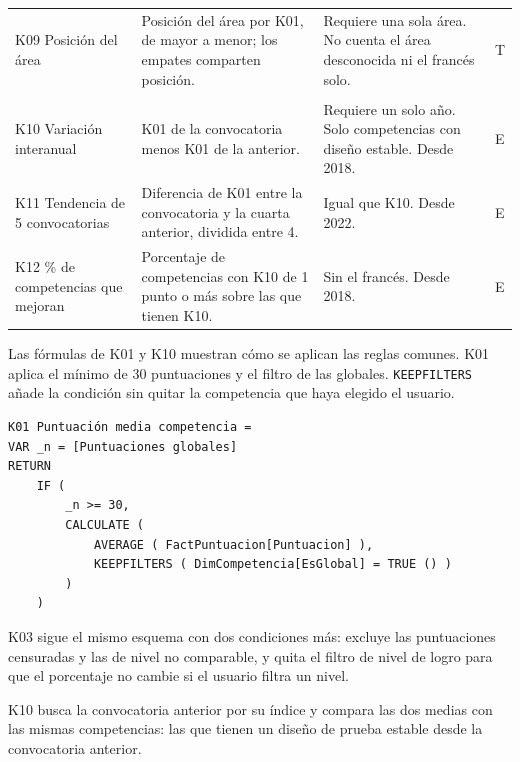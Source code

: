 \documentclass[12pt, a4paper, oneside]{report}
\begin{document}
{\begin{longtable}{@{} >{\raggedright\arraybackslash}p{2.6cm} p{5.9cm} p{4.3cm} >{\raggedright\arraybackslash}p{1.1cm} @{}}
K09 Posición del área & Posición del área por K01, de mayor a menor; los empates comparten posición. & Requiere una sola área. No cuenta el área desconocida ni el francés solo. & T \\ \addlinespace
\multicolumn{4}{@{}l}{\textit{Eficiencia y progreso}} \\
K10 Variación interanual & K01 de la convocatoria menos K01 de la anterior. & Requiere un solo año. Solo competencias con diseño estable. Desde 2018. & E \\ \addlinespace
K11 Tendencia de 5 convocatorias & Diferencia de K01 entre la convocatoria y la cuarta anterior, dividida entre 4. & Igual que K10. Desde 2022. & E \\ \addlinespace
K12 \% de competencias que mejoran & Porcentaje de competencias con K10 de 1 punto o más sobre las que tienen K10. & Sin el francés. Desde 2018. & E \\
\end{longtable}}

Las fórmulas de K01 y K10 muestran cómo se aplican las reglas comunes. K01 aplica el mínimo de 30 puntuaciones y el filtro de las globales. \texttt{KEEPFILTERS} añade la condición sin quitar la competencia que haya elegido el usuario.

\par\vspace{2ex}\noindent\begin{minipage}{\textwidth}\small{}
\begin{verbatim}
K01 Puntuación media competencia =
VAR _n = [Puntuaciones globales]
RETURN
    IF (
        _n >= 30,
        CALCULATE (
            AVERAGE ( FactPuntuacion[Puntuacion] ),
            KEEPFILTERS ( DimCompetencia[EsGlobal] = TRUE () )
        )
    )
\end{verbatim}
\end{minipage}\par\vspace{2.5ex}

K03 sigue el mismo esquema con dos condiciones más: excluye las puntuaciones censuradas y las de nivel no comparable, y quita el filtro de nivel de logro para que el porcentaje no cambie si el usuario filtra un nivel.

K10 busca la convocatoria anterior por su índice y compara las dos medias con las mismas competencias: las que tienen un diseño de prueba estable desde la convocatoria anterior.
\end{document}
